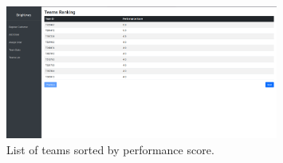 \begin{figure}[H]
    \centering
    \includegraphics[width=0.8\textwidth]{img/web_app/list.png}
    \caption{List of teams sorted by performance score.}
\end{figure}